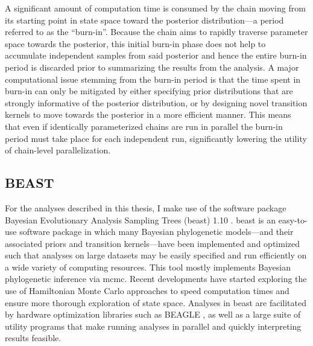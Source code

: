 A significant amount of computation time is consumed by the chain moving from its starting point in state space toward the posterior distribution---a period referred to as the ``burn-in''.
Because the chain aims to rapidly traverse parameter space towards the posterior, this initial burn-in phase does not help to accumulate independent samples from said posterior and hence the entire burn-in period is discarded prior to summarizing the results from the analysis.
A major computational issue stemming from the burn-in period is that the time spent in burn-in can only be mitigated by either specifying prior distributions that are strongly informative of the posterior distribution, or by designing novel transition kernels to move towards the posterior in a more efficient manner.
This means that even if identically parameterized chains are run in parallel the burn-in period must take place for each independent run, significantly lowering the utility of chain-level parallelization.

\subsection{BEAST}

For the analyses described in this thesis, I make use of the software package Bayesian Evolutionary Analysis Sampling Trees (\gls{beast}) 1.10 \cite{suchard2018bayesian}.
\gls{beast} is an easy-to-use software package in which many Bayesian phylogenetic models---and their associated priors and transition kernels---have been implemented and optimized such that analyses on large datasets may be easily specified and run efficiently on a wide variety of computing resources.
This tool mostly implements Bayesian phylogenetic inference via \gls{mcmc}.
Recent developments have started exploring the use of Hamiltonian Monte Carlo approaches to speed computation times and ensure more thorough exploration of state space.
Analyses in \gls{beast} are facilitated by hardware optimization libraries such as BEAGLE \cite{ayres2019beagle}, as well as a large suite of utility programs that make running analyses in parallel and quickly interpreting results feasible.

